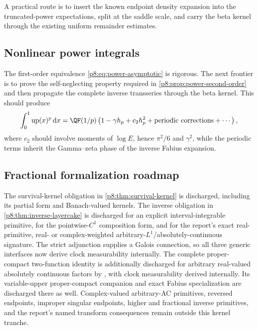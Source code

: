 \documentclass[11pt,oneside]{article}
\theoremstyle{definition}
\theoremstyle{remark}
\newcommand{\Up}{\operatorname{up}}
\newcommand{\dd}{\,\mathrm d}
\newcommand{\1}{\mathbf 1}
\begin{document}
A practical route is to insert the known endpoint density expansion into the
truncated-power expectations, split at the saddle scale, and carry the beta
kernel through the existing uniform remainder estimates.

\subsection{Nonlinear power integrals}

The first-order equivalence \eqref{p8:eq:power-asymptotic} is rigorous.  The next
frontier is to prove the self-neglecting property required in
\cref{p8:prop:power-second-order} and then propagate the complete inverse
transseries through the beta kernel.  This should produce
\begin{equation}
 \int_0^1\Up(x)^p\dd x
 =\QF(1/p)\left(1-\gamma h_p+c_2h_p^2+\text{periodic corrections}+\cdots\right),
 \label{p8:eq:power-full-frontier}
\end{equation}
where \(c_2\) should involve moments of \(\log E\), hence \(\pi^2/6\) and
\(\gamma^2\), while the periodic terms inherit the Gamma--zeta phase of the
inverse Fabius expansion.

\subsection{Fractional formalization roadmap}

\begin{statusbox}
The survival-kernel obligation in \cref{p8:thm:survival-kernel} is discharged, including
its partial form and Banach-valued kernels.  The inverse obligation in
\cref{p8:thm:inverse-layercake} is discharged for an explicit interval-integrable
primitive, for the pointwise-\(C^1\) composition form, and for the report's exact
real-primitive, real- or complex-weighted arbitrary-\(L^1\)/absolutely-continuous
signature.  The strict adjunction supplies a Galois connection, so all three generic
interfaces now derive clock measurability internally.  The complete proper-compact
two-function identity is additionally discharged for arbitrary real-valued absolutely
continuous factors by , with clock measurability derived
internally.  Its variable-upper proper-compact companion and exact Fabius specialization
are discharged there as well.  Complex-valued arbitrary-AC primitives, reversed endpoints,
improper singular endpoints, higher and fractional inverse primitives, and the report's
named transform consequences remain outside this kernel tranche.
\end{statusbox}
\end{document}
